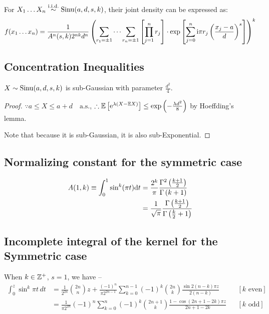 \begin{thm}\label{thm:jtdens}
	For $X_1\dots X_n \mathrel{\overset{\text{i.i.d.}}{\sim}} \operatorname*{Sinu}(a,d,s,k)$, their joint density can be expressed as:
	\begin{equation}
		f(x_1\dots x_n) = \frac{1}{A^n(s,k) 2^{nk} d^n } \left( \sum_{r_1=\pm1}\cdots \sum_{r_n = \pm 1} \left[\prod_{j=1}^n r_j\right] \cdot \exp\left[\sum_{j=0}^n \mathrm i \pi r_j \left(\frac{x_j -a}{d}\right)^s\right]  \right)^k
	\end{equation}
\end{thm}

\subsection{Concentration Inequalities}
\begin{thm}
	$X \sim \operatorname*{Sinu} (a,d,s,k)$ is sub-Gaussian with parameter $\frac{d^2}{4}$.
\end{thm}
\begin{proof}
	$\because a \le X \le a+d \quad\text{a.s.}$, $\therefore \mathbb E \left[ \mathrm e^{\lambda (X - \mathbb E X)} \right] \le \exp \left( -\frac{\lambda d^2}{8} \right)$ by Hoeffding's lemma.
	
	Note that because it is sub-Gaussian, it is also sub-Exponential.
\end{proof}


\subsection{Normalizing constant for the symmetric case}
\begin{thm}\label{thm:norm_sym}
	\begin{align}
		A(1,k) \equiv \int_0^1 \sin^k(\pi t) \mathrm d t &= \frac{2^k}{\pi} \frac{\Gamma^2\left( \frac{k+1}{2} \right)}{\Gamma\left( k+1\right)} \label{eq:area1}\\
		&= \frac{1}{\sqrt \pi} \frac{\Gamma\left(\frac{k+1}{2}\right)}{\Gamma\left(\frac{k}{2} + 1\right)} \label{eq:area2}
	\end{align}
\end{thm}


\subsection{Incomplete integral of the kernel for the Symmetric case}
\begin{thm} \label{thm:cdf_sym}
	When $k\in \mathbb Z^+$, $s=1$, we have --
	\begin{align}
		\int_0^z \sin^k\pi t \, dt &=
		\frac{1}{2^{2n}} {2n \choose n} z + \frac{(-1)^n}{\pi 2^{2n-1}}\sum_{k=0}^{n-1} (-1)^k {2n \choose k} \frac{\sin 2(n-k)\pi z}{2(n-k)} && [\text{$k$ even}]\\
		&= \frac{1}{\pi 2^{2n}}(-1)^n \sum_{k=0}^n (-1)^k {2n+1 \choose k} \frac{1 - \cos (2n+1-2k)\pi z}{2n+1-2k}  &&  [\text{$k$ odd}]
	\end{align}
\end{thm}


